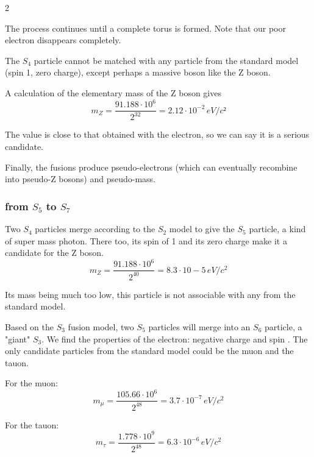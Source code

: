 	\begin{multicols}{2}
	
	The process continues until a complete torus is formed. Note that our poor electron disappears completely.
	
	The $S_4$ particle cannot be matched with any particle from the standard model (spin 1, zero charge), except perhaps a massive boson like the Z boson.
	
	A calculation of the elementary mass of the Z boson gives
	\begin{equation*}
		m_{Z} = \frac{91.188 \cdot 10^6}{2^{32}} = 2.12 \cdot 10^{-2}\,eV/c²
	\end{equation*}
	
	The value is close to that obtained with the electron, so we can say it is a serious candidate.
	
	Finally, the fusions produce pseudo-electrons (which can eventually recombine into pseudo-Z bosons) and pseudo-mass.
	
	\subsubsection{from $S_5$ to $S_7$}
	
	Two $S_4$ particles merge according to the $S_2$ model to give the $S_5$ particle, a kind of super mass photon. There too, its spin of 1 and its zero charge make it a candidate for the Z boson.
	\begin{equation*}
		m_{Z} = \frac{91.188 \cdot 10^6}{2^{40}} = 8.3 \cdot 10-5\,eV/c^2
	\end{equation*}
	
	Its mass being much too low, this particle is not associable with any from the standard model.
	
	Based on the $S_3$ fusion model, two $S_5$ particles will merge into an $S_6$ particle, a "giant" $S_3$. We find the properties of the electron: negative charge and spin . The only candidate particles from the standard model could be the muon and the tauon.
	
	For the muon:
	\begin{equation*}
		m_{\mu} = \frac{105.66 \cdot 10^6} {2^{48}} = 3.7 \cdot 10^{-7}\,eV/c^2
	\end{equation*}
	
	For the tauon:
	\begin{equation*}
		m_{\tau} = \frac{1.778 \cdot 10^9}{ 2^{48}} = 6.3 \cdot 10^{-6}\,eV/c^2
	\end{equation*}
	

\end{multicols}
